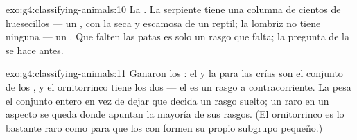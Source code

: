 \begin{solution}{exo:g4:classifying-animals:10}
La . La serpiente tiene una columna de cientos de
huesecillos --- un , con la  seca y escamosa de un
reptil; la lombriz no tiene ninguna  --- un
. Que falten las patas es solo un rasgo que falta; la
pregunta de la  se hace antes.
\end{solution}

\begin{solution}{exo:g4:classifying-animals:11}
Ganaron los : el  y la  para las crías son el
conjunto de los , y el ornitorrinco tiene los dos --- el
 es un rasgo a contracorriente. La  pesa el conjunto
entero en vez de dejar que decida un rasgo suelto; un  raro en
un aspecto se queda donde apuntan la mayoría de sus rasgos. (El
ornitorrinco es lo bastante raro como para que los  con
 formen su propio subgrupo pequeño.)
\end{solution}
